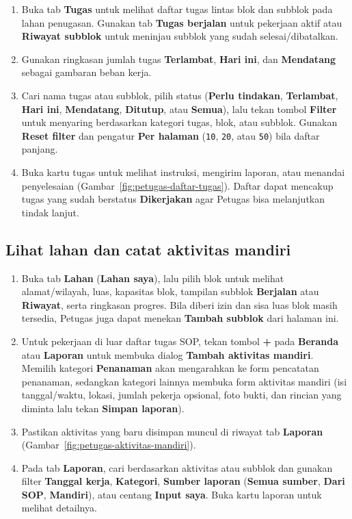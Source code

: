 \begin{enumerate}
  \item Buka tab \textbf{Tugas} untuk melihat daftar tugas lintas blok dan subblok pada lahan penugasan. Gunakan tab \textbf{Tugas berjalan} untuk pekerjaan aktif atau \textbf{Riwayat subblok} untuk meninjau subblok yang sudah selesai/dibatalkan.
  \item Gunakan ringkasan jumlah tugas \textbf{Terlambat}, \textbf{Hari ini}, dan \textbf{Mendatang} sebagai gambaran beban kerja.
  \item Cari nama tugas atau subblok, pilih status (\textbf{Perlu tindakan}, \textbf{Terlambat}, \textbf{Hari ini}, \textbf{Mendatang}, \textbf{Ditutup}, atau \textbf{Semua}), lalu tekan tombol \textbf{Filter} untuk menyaring berdasarkan kategori tugas, blok, atau subblok. Gunakan \textbf{Reset filter} dan pengatur \textbf{Per halaman} (\texttt{10}, \texttt{20}, atau \texttt{50}) bila daftar panjang.
  \item Buka kartu tugas untuk melihat instruksi, mengirim laporan, atau menandai penyelesaian (Gambar~\ref{fig:petugas-daftar-tugas}). Daftar dapat mencakup tugas yang sudah berstatus \textbf{Dikerjakan} agar Petugas bisa melanjutkan tindak lanjut.
\end{enumerate}


\subsection{Lihat lahan dan catat aktivitas mandiri}

\begin{enumerate}
  \item Buka tab \textbf{Lahan} (\textbf{Lahan saya}), lalu pilih blok untuk melihat alamat/wilayah, luas, kapasitas blok, tampilan subblok \textbf{Berjalan} atau \textbf{Riwayat}, serta ringkasan progres. Bila diberi izin dan sisa luas blok masih tersedia, Petugas juga dapat menekan \textbf{Tambah subblok} dari halaman ini.
  \item Untuk pekerjaan di luar daftar tugas SOP, tekan tombol \textbf{+} pada \textbf{Beranda} atau \textbf{Laporan} untuk membuka dialog \textbf{Tambah aktivitas mandiri}. Memilih kategori \textbf{Penanaman} akan mengarahkan ke form pencatatan penanaman, sedangkan kategori lainnya membuka form aktivitas mandiri (isi tanggal/waktu, lokasi, jumlah pekerja opsional, foto bukti, dan rincian yang diminta lalu tekan \textbf{Simpan laporan}).
  \item Pastikan aktivitas yang baru disimpan muncul di riwayat tab \textbf{Laporan} (Gambar~\ref{fig:petugas-aktivitas-mandiri}).
  \item Pada tab \textbf{Laporan}, cari berdasarkan aktivitas atau subblok dan gunakan filter \textbf{Tanggal kerja}, \textbf{Kategori}, \textbf{Sumber laporan} (\textbf{Semua sumber}, \textbf{Dari SOP}, \textbf{Mandiri}), atau centang \textbf{Input saya}. Buka kartu laporan untuk melihat detailnya.
\end{enumerate}

